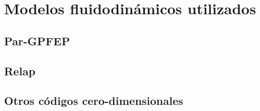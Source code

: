 \chapter{Modelos fluidodinámicos utilizados}

\section{Par-GPFEP}
\label{3:pargpfep}

\section{Relap}
\label{3:relap}

\section{Otros códigos cero-dimensionales}
\label{3:solver0d}

